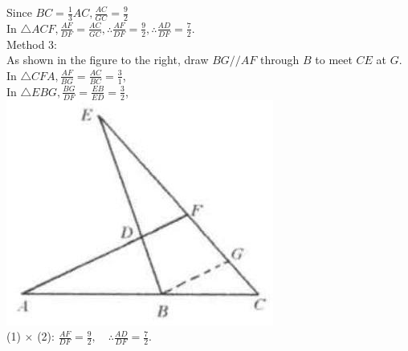 \documentclass[10pt]{article}
\begin{document}
Since \(B C=\frac{1}{3} A C, \frac{A C}{G C}=\frac{9}{2}\)\\
In \(\triangle A C F, \frac{A F}{D F}=\frac{A C}{G C}, \therefore \frac{A F}{D F}=\frac{9}{2}, \therefore \frac{A D}{D F}=\frac{7}{2}\).\\
Method 3:\\
As shown in the figure to the right, draw \(B G / / A F\) through \(B\) to meet \(C E\) at \(G\).\\
In \(\triangle C F A, \frac{A F}{B G}=\frac{A C}{B C}=\frac{3}{1}\),\\
In \(\triangle E B G, \frac{B G}{D F}=\frac{E B}{E D}=\frac{3}{2}\),\\
\includegraphics[max width=\textwidth, center]{2025_04_17_97bc1f7e44d93c271a88g-112(1)}\\
(1) \(\times\) (2): \(\frac{A F}{D F}=\frac{9}{2}, \quad \therefore \frac{A D}{D F}=\frac{7}{2}\).
\end{document}
